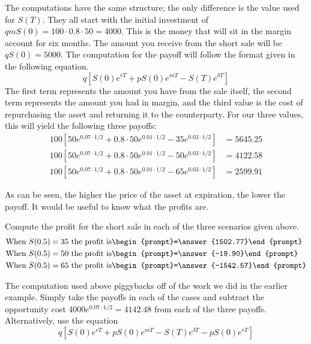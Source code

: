 \documentclass{ximera}
\begin{document}
\begin{solution}
The computations have the same structure; the only difference is the value used for $S(T)$. They all start with the initial investment of $qmS(0)=100\cdot 0.8\cdot 50=4000$. This is the money that will sit in the margin account for six months. The amount you receive from the short sale will be $qS(0)=5000$. The computation for the payoff will follow the format given in the following equation.
	\begin{equation*}
	q[S(0)e^{rT}+pS(0)e^{mT}-S(T)e^{\delta T}]
	\end{equation*}
The first term represents the amount you have from the sale itself, the second term represents the amount you had in margin, and the third value is the cost of repurchasing the asset and returning it to the counterparty. For our three values, this will yield the following three payoffs:
	\begin{align*}
	100[50e^{0.07\cdot 1/2}+0.8\cdot 50e^{0.01\cdot 1/2}-35e^{0.03\cdot 1/2}]&=5645.25\\
	100[50e^{0.07\cdot 1/2}+0.8\cdot 50e^{0.01\cdot 1/2}-50e^{0.03\cdot 1/2}]&=4122.58\\
	100[50e^{0.07\cdot 1/2}+0.8\cdot 50e^{0.01\cdot 1/2}-65e^{0.03\cdot 1/2}]&=2599.91
	\end{align*}
\end{solution}

As can be seen, the higher the price of the asset at expiration, the lower the payoff. It would be useful to know what the profits are.

\begin{question}
Compute the profit for the short sale in each of the three scenarios given above.
	\begin{align*}
	\text{When }S(0.5)=35\text{ the profit is}&\begin{prompt}=\answer{1502.77}\end{prompt}\\
	\text{When }S(0.5)=50\text{ the profit is}&\begin{prompt}=\answer{-19.90}\end{prompt}\\
	\text{When }S(0.5)=65\text{ the profit is}&\begin{prompt}=\answer{-1542.57}\end{prompt}
	\end{align*}
\end{question}

\begin{solution}
The computation used above piggybacks off of the work we did in the earlier example. Simply take the payoffs in each of the cases and subtract the opportunity cost $4000e^{0.07\cdot 1/2}=4142.48$ from each of the three payoffs. Alternatively, use the equation
	\begin{equation*}
	q[S(0)e^{rT}+pS(0)e^{mT}-S(T)e^{\delta T}-pS(0)e^{rT}]
	\end{equation*}
\end{solution}
\end{document}
